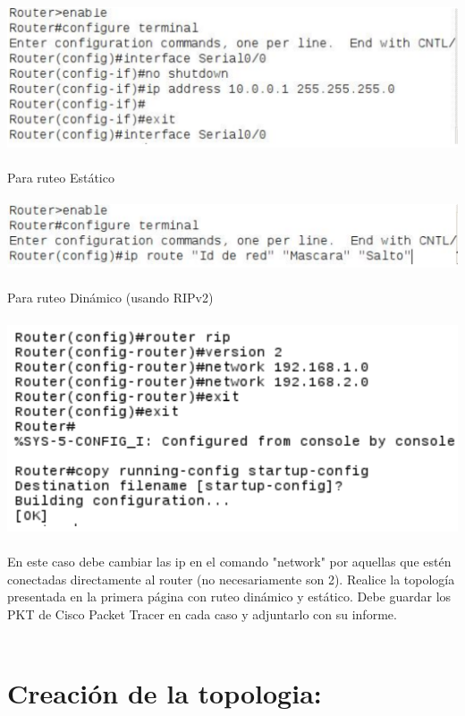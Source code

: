 \documentclass{article}
\begin{document}
\includegraphics[scale=0.375]{comand2.png}\\\\

Para ruteo Estático\\\\

\includegraphics[scale=0.375]{comand3.png}\\\\

Para ruteo Dinámico (usando RIPv2)\\\\

\includegraphics[scale=0.6]{comand4.png}\\\\

En este caso debe cambiar las ip en el comando "network" por aquellas que estén conectadas directamente
al router (no necesariamente son 2).
Realice la topología presentada en la primera página con ruteo dinámico y estático. Debe guardar los
PKT de Cisco Packet Tracer en cada caso y adjuntarlo con su informe.\\\\

\section{Creación de la topologia:}
\end{document}
